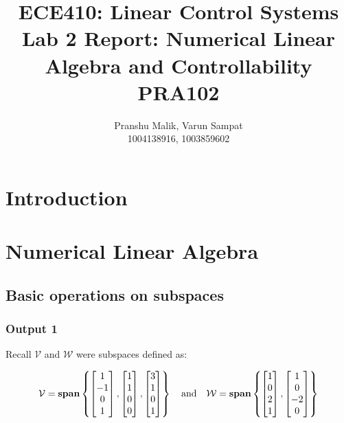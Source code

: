\documentclass[10pt]{article}
\date{}
\begin{document}
\title{\textbf{\Large{\textsc{ECE410:} Linear Control Systems}} \\ \Large{Lab 2 Report: Numerical Linear Algebra and Controllability} \\ \textbf{\small{PRA102}}\vspace{-0.3cm}}
\author{Pranshu Malik, Varun Sampat \\ \footnotesize{1004138916}, \footnotesize{1003859602}\vspace{-3cm}}

\maketitle

\section{Introduction}

\section{Numerical Linear Algebra}
\subsection{Basic operations on subspaces}
\subsubsection{Output 1}
Recall $ \mathcal{V} $ and $ \mathcal{W} $ were subspaces defined as:

\begin{equation*}
    \mathcal{V} = \mathbf{span}
    \begin{Bmatrix}
        \begin{bmatrix} 1\\-1\\0\\1 \end{bmatrix},
        \begin{bmatrix} 1\\1\\0\\0 \end{bmatrix},
        \begin{bmatrix} 3\\1\\0\\1 \end{bmatrix}
    \end{Bmatrix}
    \quad
    \text{and}
    \quad
    \mathcal{W} = \mathbf{span}
    \begin{Bmatrix}
        \begin{bmatrix} 1\\0\\2\\1 \end{bmatrix},
        \begin{bmatrix} 1\\0\\-2\\0 \end{bmatrix}
    \end{Bmatrix}
\end{equation*}
\end{document}

